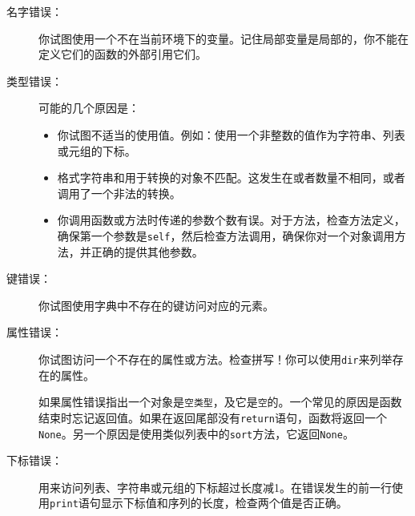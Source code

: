\begin{description}

\item[名字错误：]  你试图使用一个不在当前环境下的变量。记住局部变量是局部的，你不能在定义它们的函数的外部引用它们。


\item[类型错误：] 可能的几个原因是：

\begin{itemize}

\item 你试图不适当的使用值。例如：使用一个非整数的值作为字符串、列表或元组的下标。


\item 格式字符串和用于转换的对象不匹配。这发生在或者数量不相同，或者调用了一个非法的转换。


\item 你调用函数或方法时传递的参数个数有误。对于方法，检查方法定义，确保第一个参数是{\tt self}，然后检查方法调用，确保你对一个对象调用方法，并正确的提供其他参数。

\end{itemize}

\item[键错误：]  你试图使用字典中不存在的键访问对应的元素。


\item[属性错误：] 你试图访问一个不存在的属性或方法。检查拼写！你可以使用{\tt dir}来列举存在的属性。

如果属性错误指出一个对象是{\tt 空类型}，及它是{\tt 空}的。一个常见的原因是函数结束时忘记返回值。如果在返回尾部没有{\tt return}语句，函数将返回一个{\tt None}。另一个原因是使用类似列表中的{\tt sort}方法，它返回{\tt None}。


\item[下标错误：] 用来访问列表、字符串或元组的下标超过长度减1。在错误发生的前一行使用{\tt print}语句显示下标值和序列的长度，检查两个值是否正确。


\end{description}


